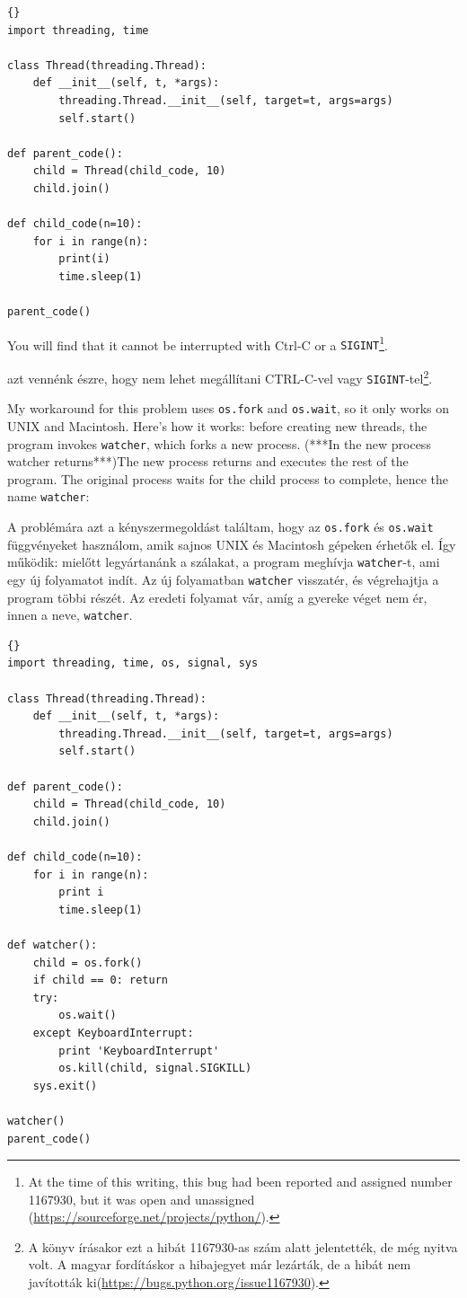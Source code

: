 \documentclass{book}
\begin{document}
\begin{lstlisting}[title={Megállíthatatlan program}]{}
import threading, time

class Thread(threading.Thread):
    def __init__(self, t, *args):
        threading.Thread.__init__(self, target=t, args=args)
        self.start()

def parent_code():
    child = Thread(child_code, 10)
    child.join()

def child_code(n=10):
    for i in range(n):
        print(i)
        time.sleep(1)

parent_code()
\end{lstlisting}

You will find that it cannot be interrupted with Ctrl-C or
a {\tt SIGINT}\footnote{At the time of this writing, this
bug had been reported and assigned number 1167930, but it was
open and unassigned (\url{https://sourceforge.net/projects/python/}).}.

azt vennénk észre, hogy nem lehet megállítani CTRL-C-vel vagy
{\tt SIGINT}-tel\footnote{A könyv írásakor ezt a hibát 1167930-as szám alatt
jelentették, de még nyitva volt. A magyar fordításkor a hibajegyet már lezárták,
de a hibát nem javították ki(\url{https://bugs.python.org/issue1167930}).}.

My workaround for this problem uses {\tt os.fork} and {\tt os.wait},
so it only works on UNIX and Macintosh.  Here's how it works:
before creating new threads, the program invokes {\tt watcher},
which forks a new process.  (***In the new process watcher returns***)The new process returns and executes
the rest of the program.  The original process waits for the
child process to complete, hence the name {\tt watcher}:

A problémára azt a kényszermegoldást találtam, hogy az {\tt os.fork} és {\tt os.wait}
függvényeket használom, amik sajnos UNIX és Macintosh gépeken érhetők el.
Így működik: mielőtt legyártanánk a szálakat, a program meghívja {\tt watcher}-t,
ami egy új folyamatot indít. Az új folyamatban {\tt watcher} visszatér,
és végrehajtja a program többi részét. Az eredeti folyamat
vár, amíg a gyereke véget nem ér, innen a neve, {\tt watcher}.

\begin{lstlisting}[title={The watcher}]{}
import threading, time, os, signal, sys

class Thread(threading.Thread):
    def __init__(self, t, *args):
        threading.Thread.__init__(self, target=t, args=args)
        self.start()

def parent_code():
    child = Thread(child_code, 10)
    child.join()

def child_code(n=10):
    for i in range(n):
        print i
        time.sleep(1)

def watcher():
    child = os.fork()
    if child == 0: return
    try:
        os.wait()
    except KeyboardInterrupt:
        print 'KeyboardInterrupt'
        os.kill(child, signal.SIGKILL)
    sys.exit()

watcher()
parent_code()
\end{lstlisting}
\end{document}

